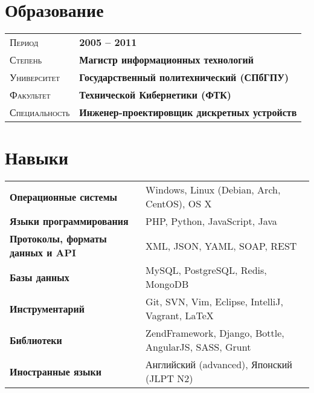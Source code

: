 \documentclass[a4paper, oneside, final]{scrartcl}
\newcommand{\gray}{\rowcolor[gray]{.90}}
\begin{document}
\begin{center}

\section{Образование}

\begin{tabularx}{0.97\linewidth}{>{\raggedleft\scshape}p{2.7cm}X}
    \gray Период & \textbf{2005 -- 2011} \\
    \gray Степень & \textbf{Магистр информационных технологий} \\
    \gray Университет & \textbf{Государственный политехнический (СПбГПУ)} \\
    \gray Факультет & \textbf{Технической Кибернетики (ФТК)} \\
    \gray Специальность & \textbf{Инженер-проектировщик дискретных устройств}
\end{tabularx}


\section{Навыки}

\begin{tabular}{ @{} >{\bfseries}l @{\hspace{6ex}} l }
    Операционные системы & Windows, Linux (Debian, Arch, CentOS), OS X \\
    Языки программирования & PHP, Python, JavaScript, Java \\
    Протоколы, форматы данных и API & XML, JSON, YAML, SOAP, REST \\
    Базы данных & MySQL, PostgreSQL, Redis, MongoDB \\
    Инструментарий & Git, SVN, Vim, Eclipse, IntelliJ, Vagrant, LaTeX \\
    Библиотеки & ZendFramework, Django, Bottle, AngularJS, SASS, Grunt \\
    Иностранные языки & Английский (advanced), Японский (JLPT N2)
\end{tabular}


\end{center}
\end{document}
